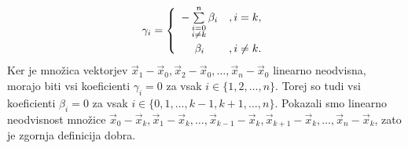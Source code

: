 \documentclass[mat1]{fmfdelo}
\newcommand{\0}{\underline{0}}
\begin{document}
\[  \gamma_i =  \left\{
\begin{array}{cl}\vspace{3pt}
	-\sum\limits_{\substack{i=0 \\ i\neq k}}^n \beta_i &, i = k,\\
	\beta_i &, i \neq k. \\
\end{array} 
\right. \]
Ker je množica vektorjev $\vec{x}_1 - \vec{x}_0, \vec{x}_2 - \vec{x}_0, \dots , \vec{x}_n - \vec{x}_0$ linearno neodvisna, morajo biti vsi koeficienti $\gamma_i = 0$ za vsak $i \in \{1, 2, \dots, n \}$. Torej so tudi vsi koeficienti $\beta_i = 0$ za vsak $i \in \{0, 1, \dots, k-1, k+1, \dots, n \}$. Pokazali smo linearno neodvisnost množice $\vec{x}_0 - \vec{x}_k, \vec{x}_1 - \vec{x}_k, \dots , \vec{x}_{k-1} - \vec{x}_k, \vec{x}_{k+1} - \vec{x}_k, \dots, \vec{x}_n - \vec{x}_k$, zato je zgornja definicija dobra. 
\end{document}

